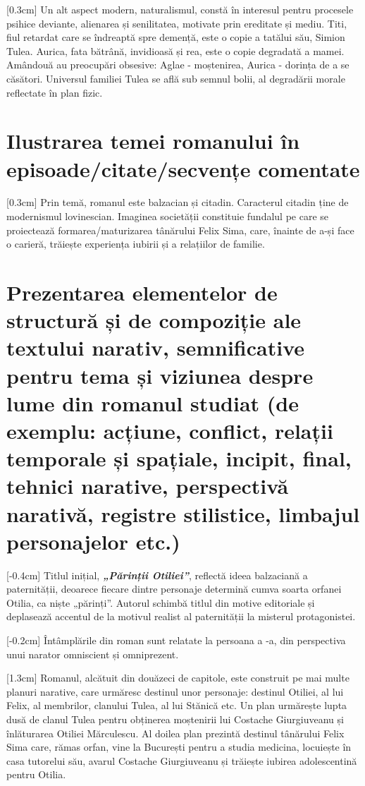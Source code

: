 \documentclass[
12pt,
a4paper
]{article}
\newcommand{\rom}[1]{\uppercase\expandafter{\romannumeral #1\relax}} %
\newcommand{\operainitialtitle}{\textbf{\textit{„Părinții Otiliei”}}} %
\begin{document}
[0.3cm]
Un alt aspect modern, naturalismul, constă în interesul pentru procesele psihice deviante, alienarea și senilitatea, motivate prin ereditate și mediu. Titi, fiul retardat care se îndreaptă spre demență, este o copie a tatălui său, Simion Tulea. Aurica, fata bătrână, invidioasă și rea, este o copie degradată a mamei. Amândouă au preocupări obsesive: Aglae - moștenirea, Aurica - dorința de a se căsători. Universul familiei Tulea se află sub semnul bolii, al degradării morale reflectate în plan fizic.

\section{Ilustrarea temei romanului în episoade/citate/secvențe comentate}

[0.3cm]
Prin temă, romanul este balzacian și citadin. Caracterul citadin ține de modernismul lovinescian. Imaginea societății constituie fundalul pe care se proiectează formarea/maturizarea tânărului Felix Sima, care, înainte de a-și face o carieră, trăiește experiența iubirii și a relațiilor de familie.

\section{Prezentarea elementelor de structură și de compoziție ale textului narativ, semnificative pentru tema și viziunea despre lume din romanul studiat {\footnotesize (de exemplu: acțiune, conflict, relații temporale și spațiale, incipit, final, tehnici narative, perspectivă narativă, registre stilistice, limbajul personajelor etc.)}}

[-0.4cm]
Titlul inițial, \operainitialtitle, reflectă ideea balzaciană a paternității, deoarece fiecare dintre personaje determină cumva soarta orfanei Otilia, ca niște „părinți”. Autorul schimbă titlul din motive editoriale și deplasează accentul de la motivul realist al paternității la misterul protagonistei.

[-0.2cm]
Întâmplările din roman sunt relatate la persoana a \rom{3}-a, din perspectiva unui narator omniscient și omniprezent.

[1.3cm]
Romanul, alcătuit din douăzeci de capitole, este construit pe mai multe planuri narative, care urmăresc destinul unor personaje: destinul Otiliei, al lui Felix, al membrilor, clanului Tulea, al lui Stănică etc. Un plan urmărește lupta dusă de clanul Tulea pentru obținerea moștenirii lui Costache Giurgiuveanu și înlăturarea Otiliei Mărculescu. Al doilea plan prezintă destinul tânărului Felix Sima care, rămas orfan, vine la București pentru a studia medicina, locuiește în casa tutorelui său, avarul Costache Giurgiuveanu și trăiește iubirea adolescentină pentru Otilia.
\end{document}
